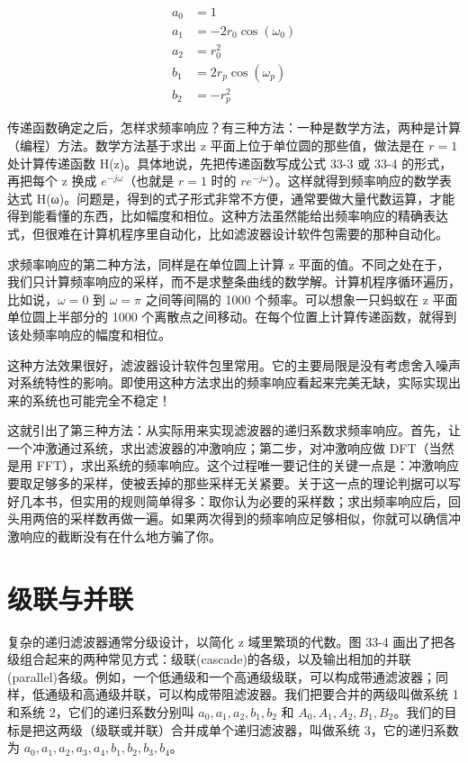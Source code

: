 \[\begin{aligned}
a_0 &= 1 \\
a_1 &= -2r_0\cos(\omega_0) \\
a_2 &= r_0^2 \\
b_1 &= 2r_p\cos(\omega_p) \\
b_2 &= -r_p^2
\end{aligned}\]

传递函数确定之后，怎样求频率响应？有三种方法：一种是数学方法，两种是计算（编程）方法。数学方法基于求出
z 平面上位于单位圆的那些值，做法是在 \(r = 1\) 处计算传递函数
H(z)。具体地说，先把传递函数写成公式 33-3 或 33-4 的形式，再把每个 z
换成 \(e^{-j\omega}\)（也就是 \(r = 1\) 时的
\(re^{-j\omega}\)）。这样就得到频率响应的数学表达式
H(ω)。问题是，得到的式子形式非常不方便，通常要做大量代数运算，才能得到能看懂的东西，比如幅度和相位。这种方法虽然能给出频率响应的精确表达式，但很难在计算机程序里自动化，比如滤波器设计软件包需要的那种自动化。

求频率响应的第二种方法，同样是在单位圆上计算 z
平面的值。不同之处在于，我们只计算频率响应的采样，而不是求整条曲线的数学解。计算机程序循环遍历，比如说，\(\omega = 0\)
到 \(\omega = \pi\) 之间等间隔的 1000 个频率。可以想象一只蚂蚁在 z
平面单位圆上半部分的 1000
个离散点之间移动。在每个位置上计算传递函数，就得到该处频率响应的幅度和相位。

这种方法效果很好，滤波器设计软件包里常用。它的主要局限是没有考虑舍入噪声对系统特性的影响。即使用这种方法求出的频率响应看起来完美无缺，实际实现出来的系统也可能完全不稳定！

这就引出了第三种方法：从实际用来实现滤波器的递归系数求频率响应。首先，让一个冲激通过系统，求出滤波器的冲激响应；第二步，对冲激响应做
DFT（当然是用
FFT），求出系统的频率响应。这个过程唯一要记住的关键一点是：冲激响应要取足够多的采样，使被丢掉的那些采样无关紧要。关于这一点的理论判据可以写好几本书，但实用的规则简单得多：取你认为必要的采样数；求出频率响应后，回头用两倍的采样数再做一遍。如果两次得到的频率响应足够相似，你就可以确信冲激响应的截断没有在什么地方骗了你。

\section{级联与并联}

复杂的递归滤波器通常分级设计，以简化 z 域里繁琐的代数。图 33-4
画出了把各级组合起来的两种常见方式：级联(cascade)的各级，以及输出相加的并联(parallel)各级。例如，一个低通级和一个高通级级联，可以构成带通滤波器；同样，低通级和高通级并联，可以构成带阻滤波器。我们把要合并的两级叫做系统
1 和系统 2，它们的递归系数分别叫 \(a_0, a_1, a_2, b_1, b_2\) 和
\(A_0, A_1, A_2, B_1, B_2\)。我们的目标是把这两级（级联或并联）合并成单个递归滤波器，叫做系统
3，它的递归系数为 \(a_0, a_1, a_2, a_3, a_4, b_1, b_2, b_3, b_4\)。

